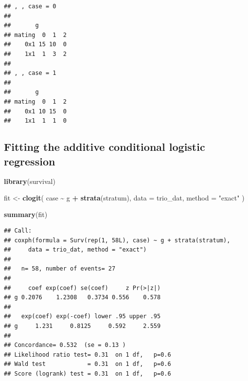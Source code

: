 \documentclass[
]{article}
\newenvironment{Shaded}{\begin{snugshade}}{\end{snugshade}}
\newcommand{\AttributeTok}[1]{\textcolor[rgb]{0.13,0.29,0.53}{#1}}
\newcommand{\CommentTok}[1]{\textcolor[rgb]{0.56,0.35,0.01}{\textit{#1}}}
\newcommand{\DecValTok}[1]{\textcolor[rgb]{0.00,0.00,0.81}{#1}}
\newcommand{\FunctionTok}[1]{\textcolor[rgb]{0.13,0.29,0.53}{\textbf{#1}}}
\newcommand{\NormalTok}[1]{#1}
\newcommand{\OtherTok}[1]{\textcolor[rgb]{0.56,0.35,0.01}{#1}}
\newcommand{\SpecialCharTok}[1]{\textcolor[rgb]{0.81,0.36,0.00}{\textbf{#1}}}
\newcommand{\StringTok}[1]{\textcolor[rgb]{0.31,0.60,0.02}{#1}}
\begin{document}
\begin{verbatim}
## , , case = 0
## 
##       g
## mating  0  1  2
##    0x1 15 10  0
##    1x1  1  3  2
## 
## , , case = 1
## 
##       g
## mating  0  1  2
##    0x1 10 15  0
##    1x1  1  1  0
\end{verbatim}

\subsection{Fitting the additive conditional logistic
regression}\label{fitting-the-additive-conditional-logistic-regression}

\begin{Shaded}
\begin{Highlighting}[]
\FunctionTok{library}\NormalTok{(survival)}

\NormalTok{fit }\OtherTok{\textless{}{-}} \FunctionTok{clogit}\NormalTok{(}
\NormalTok{  case }\SpecialCharTok{\textasciitilde{}}\NormalTok{ g }\SpecialCharTok{+} \FunctionTok{strata}\NormalTok{(stratum),}
  \AttributeTok{data =}\NormalTok{ trio\_dat,}
  \AttributeTok{method =} \StringTok{"exact"}
\NormalTok{)}

\FunctionTok{summary}\NormalTok{(fit)}
\end{Highlighting}
\end{Shaded}

\begin{verbatim}
## Call:
## coxph(formula = Surv(rep(1, 58L), case) ~ g + strata(stratum), 
##     data = trio_dat, method = "exact")
## 
##   n= 58, number of events= 27 
## 
##     coef exp(coef) se(coef)     z Pr(>|z|)
## g 0.2076    1.2308   0.3734 0.556    0.578
## 
##   exp(coef) exp(-coef) lower .95 upper .95
## g     1.231     0.8125     0.592     2.559
## 
## Concordance= 0.532  (se = 0.13 )
## Likelihood ratio test= 0.31  on 1 df,   p=0.6
## Wald test            = 0.31  on 1 df,   p=0.6
## Score (logrank) test = 0.31  on 1 df,   p=0.6
\end{verbatim}

\begin{Shaded}
\end{Shaded}
\end{document}
